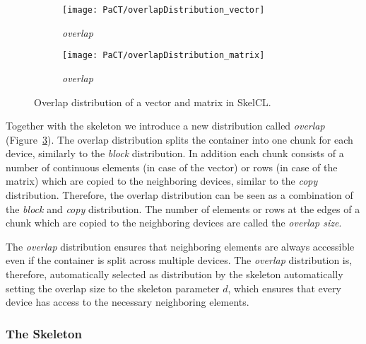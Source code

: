 \begin{figure}[tb]
  \centering
  \begin{subfigure}[b]{.3\textwidth}
    \texttt{[image: PaCT/overlapDistribution\_vector]}
    \caption{\emph{overlap}}
    \label{fig:overlap_distribution}
  \end{subfigure}
  \hspace{3em}
  \begin{subfigure}[b]{.22\textwidth}
    \texttt{[image: PaCT/overlapDistribution\_matrix]}
    \caption{\emph{overlap}}
    \label{fig:overlap_distribution:matrix}
  \end{subfigure}
  \caption{Overlap distribution of a vector and matrix in SkelCL.}
  \label{fig:overlap_distribution}
  \bigskip
\end{figure}

Together with the \stencil skeleton we introduce a new distribution called \emph{overlap} (Figure~\ref{fig:overlap_distribution}).
The overlap distribution splits the container into one chunk for each device, similarly to the \emph{block} distribution.
In addition each chunk consists of a number of continuous elements (in case of the vector) or rows (in case of the matrix) which are copied to the neighboring devices, similar to the \emph{copy} distribution.
Therefore, the overlap distribution can be seen as a combination of the \emph{block} and \emph{copy} distribution.
The number of elements or rows at the edges of a chunk which are copied to the neighboring devices are called the \emph{overlap size}.

The \emph{overlap} distribution ensures that neighboring elements are always accessible even if the container is split across multiple devices.
The \emph{overlap} distribution is, therefore, automatically selected as distribution by the \stencil skeleton automatically setting the overlap size to the skeleton parameter $d$, which ensures that every device has access to the necessary neighboring elements.





\subsubsection{The \allpairs Skeleton}
\label{sec:allpairs_skeleton}

